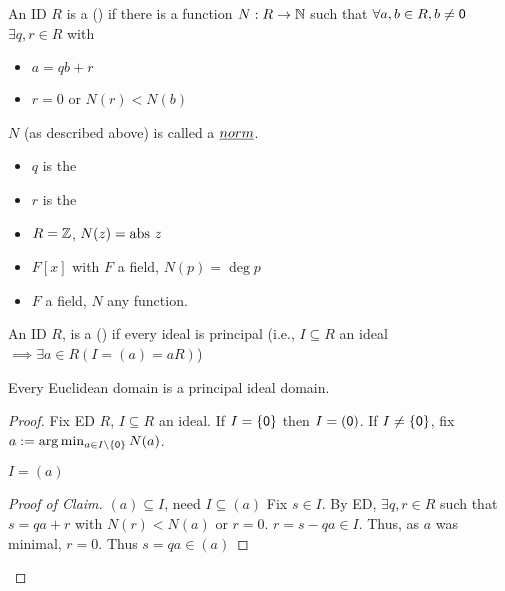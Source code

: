 \documentclass[notes.tex]{subfiles}
\begin{document}
\begin{defn}
	An ID $R$ is a  () if there is a function $N:R\to \mathbb{N}$ such that $\forall a, b\in R, b\ne \mathsf{0}$ $\exists q , r\in R $ with
	\begin{itemize}
	 	\item $a=qb+r$
	 	\item $r=0$ or $N(r) < N(b)$ 
	 \end{itemize} 
\end{defn}

\begin{notation}
	$N$ (as described above) is called a $\kw{norm}$.
	\begin{itemize}
		\item $q$ is the 
		\item $r$ is the 
	\end{itemize}
\end{notation}

\begin{eg}\leavevmode
	\begin{itemize}
		\item $R = \mathbb{Z}$, $N(z) = \mathrm{abs\ } z$
		\item $F[x]$ with $F$ a field, $N(p) = \deg p$
		\item $F$ a field, $N$ any function.
	\end{itemize}
\end{eg}

\begin{defn}
	An ID $R$, is a  () if every ideal is principal (i.e., $I\subseteq R$ an ideal $\implies \exists a\in R (I = (a) = aR)$)
\end{defn}

\begin{proposition}
	Every Euclidean domain is a principal ideal domain.
\end{proposition}
\begin{proof}
	Fix ED $R$, $I\subseteq R$ an ideal. If $I = \{\mathsf{0}\}$ then $I = (\mathsf{0})$. If $I \ne \{\mathsf{0}\}$, fix $a := \arg\min_{a\in I\setminus\{\mathsf{0}\}} N(a)$.
	\begin{claim}
		$I=(a)$
	\end{claim}
	\begin{proof}[Proof of Claim]
		$(a)\subseteq I$, need $I\subseteq (a)$ Fix $s\in I$. By ED, $\exists q, r\in R$ such that $s=qa+r$ with $N(r) < N(a)$ or $r=0$. $r = s-qa\in I$. Thus, as $a$ was minimal, $r=0$. Thus $s=qa \in (a)$
	\end{proof}
\end{proof}
\end{document}
